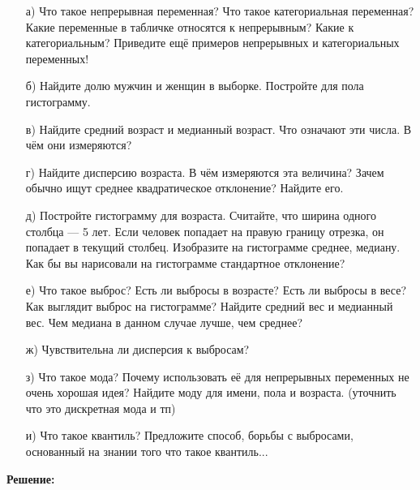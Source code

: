 \documentclass[12pt, a4paper, oneside]{article}
\begin{document}
\begin{enumerate}
	\item[а)] Что такое непрерывная переменная? Что такое категориальная переменная? Какие переменные в табличке относятся к непрерывным? Какие к категориальным?  Приведите ещё примеров непрерывных и категориальных переменных! 
	
	\item[б)]  Найдите долю мужчин и женщин в выборке. Постройте для пола гистограмму. 
	
	\item[в)] Найдите средний возраст и медианный возраст.  Что означают эти числа. В чём они измеряются? 

	\item[г)] Найдите дисперсию возраста. В чём измеряются эта величина? Зачем обычно ищут среднее квадратическое отклонение? Найдите его. 	
	
	\item[д)]  Постройте гистограмму для возраста. Считайте, что ширина одного столбца --- 5 лет. Если человек попадает на правую границу отрезка, он попадает в текущий столбец.  Изобразите на гистограмме среднее, медиану. Как бы вы нарисовали на гистограмме стандартное отклонение? 
	
	\item[е)] Что такое выброс? Есть ли выбросы в возрасте? Есть ли выбросы в весе? Как выглядит выброс на гистограмме? Найдите средний вес и медианный вес. Чем медиана в данном случае лучше, чем среднее?
	
	\item[ж)] Чувствительна ли дисперсия к выбросам?
	
	\item[з)] Что такое мода? Почему использовать её для непрерывных переменных не очень хорошая идея? Найдите моду для имени, пола и возраста.  (уточнить что это дискретная мода и тп) 
	
	\item[и)]  Что такое квантиль? Предложите способ,  борьбы с выбросами, основанный на знании того что такое квантиль... 
\end{enumerate}

\textbf{Решение:} 
\end{document}
